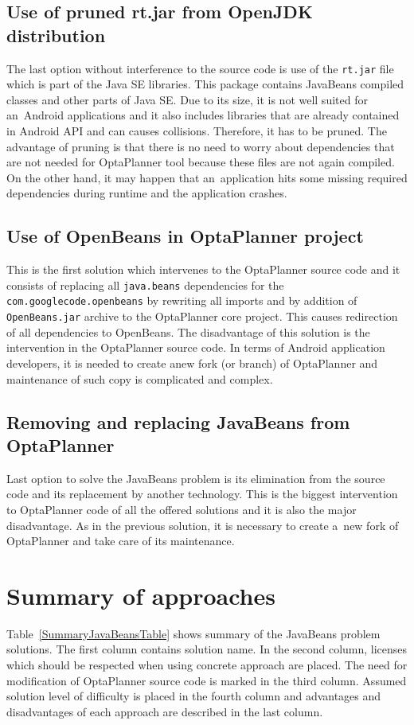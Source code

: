 \subsection{Use of pruned rt.jar from OpenJDK distribution}\label{PrunedJarSection}
The last option without interference to the source code is use of the \texttt{rt.jar} file which is part of the Java SE
libraries. This package contains JavaBeans compiled classes and other parts of Java SE. Due to its size, it is not well
suited for an~Android applications and it also includes libraries that are already contained in Android API and can
causes collisions. Therefore, it has to be pruned. The advantage of pruning is that there is no need to worry about
dependencies that are not needed for OptaPlanner tool because these files are not again compiled. On the other hand,
it may happen that an~application hits some missing required dependencies during runtime and the application crashes.

\subsection{Use of OpenBeans in OptaPlanner project}\label{UseOpenBeansSection}
This is the first solution which intervenes to the OptaPlanner source code and it consists of replacing all
\texttt{java.beans} dependencies for the \texttt{com.googlecode.openbeans} by rewriting all imports and by addition of
\texttt{OpenBeans.jar} archive to the OptaPlanner core project. This causes redirection of all dependencies to
OpenBeans. The disadvantage of this solution is the intervention in the OptaPlanner source code. In terms of Android
application developers, it is needed to create anew fork (or branch) of OptaPlanner and maintenance of such copy is
complicated and complex.

\subsection{Removing and replacing JavaBeans from OptaPlanner}\label{RemoveJavaBeansSection}
Last option to solve the JavaBeans problem is its elimination from the source code and its replacement by another
technology. This is the biggest intervention to OptaPlanner code of all the offered solutions and it is also the major
disadvantage. As in the previous solution, it is necessary to create a~new fork of OptaPlanner and take care of its
maintenance.

\section{Summary of approaches}\label{SummarySection}
Table~\ref{SummaryJavaBeansTable} shows summary of the JavaBeans problem solutions. The first column contains solution
name. In the second column, licenses which should be respected when using concrete approach are placed. The need for
modification of OptaPlanner source code is marked in the third column. Assumed solution level of difficulty is placed in
the fourth column and advantages and disadvantages of each approach are described in the last column.


